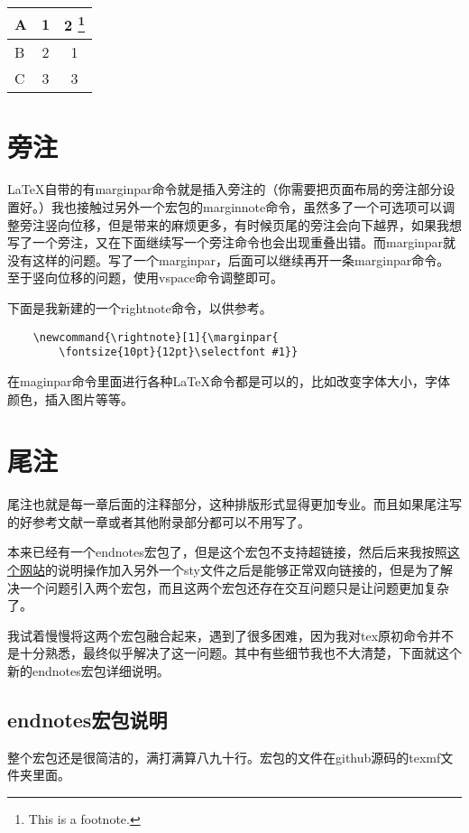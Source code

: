 \documentclass[11pt,oneside]{book}
\begin{document}
  \begin{minipage}{6cm}
	\begin{tabular}{|l|c|c|}
      \hline
      A & 1 & 2 \footnote{This is a footnote.} \\
      \hline
      B & 2 & 1 \\
      \hline
      C & 3 & 3 \\
      \hline
	\end{tabular}
  \end{minipage}




  \chapter{旁注}
  \LaTeX 自带的有marginpar命令就是插入旁注的（你需要把页面布局的旁注部分设置好。）我也接触过另外一个宏包的marginnote命令，虽然多了一个可选项可以调整旁注竖向位移，但是带来的麻烦更多，有时候页尾的旁注会向下越界，如果我想写了一个旁注，又在下面继续写一个旁注命令也会出现重叠出错。而marginpar就没有这样的问题。写了一个marginpar，后面可以继续再开一条marginpar命令。至于竖向位移的问题，使用vspace命令调整即可。

  下面是我新建的一个rightnote命令，以供参考。
  \begin{Verbatim}
    \newcommand{\rightnote}[1]{\marginpar{
        \fontsize{10pt}{12pt}\selectfont #1}}
  \end{Verbatim}

  在maginpar命令里面进行各种\LaTeX 命令都是可以的，比如改变字体大小，字体颜色，插入图片等等。



  \chapter{尾注}
  尾注也就是每一章后面的注释部分，这种排版形式显得更加专业。而且如果尾注写的好参考文献一章或者其他附录部分都可以不用写了。

  本来已经有一个endnotes宏包了，但是这个宏包不支持超链接，然后后来我按照\href{http://tex.stackexchange.com/questions/8452/making-endnotes-clickable-links-with-hyperref}{这个网站}的说明操作加入另外一个sty文件之后是能够正常双向链接的，但是为了解决一个问题引入两个宏包，而且这两个宏包还存在交互问题只是让问题更加复杂了。

  我试着慢慢将这两个宏包融合起来，遇到了很多困难，因为我对tex原初命令并不是十分熟悉，最终似乎解决了这一问题。其中有些细节我也不大清楚，下面就这个新的endnotes宏包详细说明。


  \section{endnotes宏包说明}
  整个宏包还是很简洁的，满打满算八九十行。宏包的文件在github源码的texmf文件夹里面。
\end{document}
